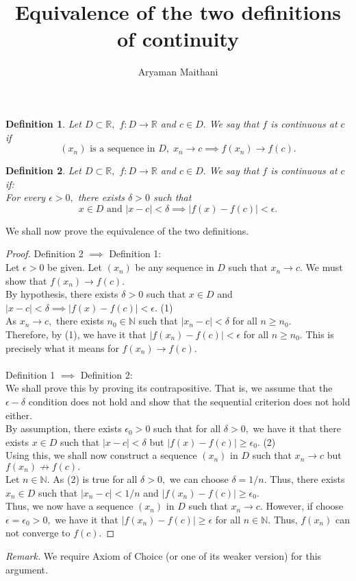 \documentclass{article}
\title{Equivalence of the two definitions of continuity}
\author{Aryaman Maithani}
\date{}
\newtheorem{defn}{Definition}
\begin{document}
\maketitle

\hrulefill

\vspace{0.5cm}
\begin{defn}
	Let $D \subset \mathbb{R},$ $f:D\to\mathbb{R}$ and $c \in D.$ We say that $f$ is continuous at $c$ if
	\[(x_n) \text{ is a sequence in } D,\;x_n \to c \implies f(x_n) \to f(c).\]
\end{defn}
\begin{defn}
	Let $D \subset \mathbb{R},$ $f:D\to\mathbb{R}$ and $c \in D.$ We say that $f$ is continuous at $c$ if:\\
	For every $\epsilon > 0,$ there exists $\delta > 0$ such that
	\[x \in D \text{ and } |x - c| < \delta \implies |f(x) - f(c)| < \epsilon.\]
\end{defn}
We shall now prove the equivalence of the two definitions.\\
\begin{proof}
	Definition 2 $\implies$ Definition 1:\\
	Let $\epsilon > 0$ be given. Let $(x_n)$ be any sequence in $D$ such that $x_n \to c.$ We must show that $f(x_n) \to f(c).$\\
	By hypothesis, there exists $\delta > 0$ such that $x \in D$ and $|x - c| < \delta \implies |f(x) - f(c)| < \epsilon.$ \hfill (1)\\
	As $x_n \to c,$ there exists $n_0 \in \mathbb{N}$ such that $|x_n - c| < \delta$ for all $n \ge n_0.$\\
	Therefore, by (1), we have it that $|f(x_n) - f(c)| < \epsilon$ for all $n \ge n_0.$ This is precisely what it means for $f(x_n) \to f(c).$\\~\\
	Definition 1 $\implies$ Definition 2:\\
	We shall prove this by proving its contrapositive. That is, we assume that the $\epsilon-\delta$ condition does not hold and show that the sequential criterion does not hold either.\\
	By assumption, there exists $\epsilon_0 > 0$ such that for all $\delta > 0,$ we have it that there exists $x \in D$ such that $|x - c| < \delta$ but $|f(x) - f(c)| \ge \epsilon_0.$ \hfill (2)\\
	Using this, we shall now construct a sequence $(x_n)$ in $D$ such that $x_n \to c$ but $f(x_n) \not\to f(c).$\\
	Let $n \in \mathbb{N}.$ As (2) is true for all $\delta > 0,$ we can choose $\delta = 1/n.$ Thus, there exists $x_n \in D$ such that $|x_n - c| < 1/n$ and $|f(x_n) - f(c)| \ge \epsilon_0.$\\
	Thus, we now have a sequence $(x_n)$ in $D$ such that $x_n \to c.$ However, if choose $\epsilon = \epsilon_0 > 0,$ we have it that $|f(x_n) - f(c)| \ge \epsilon$ for all $n \in \mathbb{N}.$ Thus, $f(x_n)$ can not converge to $f(c).$
\end{proof}

	\emph{Remark.} We require Axiom of Choice (or one of its weaker version) for this argument.
\end{document}
